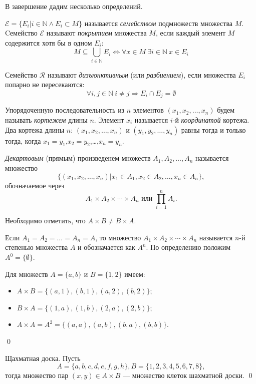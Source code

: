 В завершение дадим несколько определений.

$\mathcal{E}=\{E_i|i\in\mathbb{N}\land E_i\subset M\}$ называется \emph{семейством} подмножеств множества $M$. Cемейство $\mathcal{E}$ называют \emph{покрытием} множества $M$, если каждый элемент $M$ содержится хотя бы в одном $E_i$:
\[
M\subseteq\bigcup_{i\in\mathbb{N}}E_i
\Leftrightarrow
\forall x\in M~\exists i\in\mathbb{N}~x\in E_i
\]

Семейство $\mathcal{R}$ называют \emph{дизъюнктивным} (или \emph{разбиением}), если множества $E_i$ попарно не пересекаются:
\[
\forall i,j\in\mathbb{N}~i\neq j\Rightarrow E_i\cap E_j=\emptyset
\]

Упорядоченную последовательность из $n$ элементов $(x_1,x_2,\ldots,x_n)$ будем называть \emph{кортежем} длины $n$. Элемент $x_i$ называется $i$-й \emph{координатой} кортежа. Два кортежа длины $n$: $(x_1,x_2,\ldots,x_n)$ и $(y_1,y_2,\ldots,y_n)$ равны тогда и только тогда, когда $x_1=y_1$,$x_2=y_2$,\ldots,$x_n=y_n$.

\emph{Декартовым} (прямым) произведенем множеств $A_1,A_2,\ldots,A_n$ называется множество 
\[\{(x_1,x_2,\ldots,x_n)|x_1\in A_1,x_2\in A_2,\ldots,x_n\in A_n\},\]
обозначаемое через 
\[A_1\times A_2\times\cdots\times A_n \text{~или~} \prod_{i=1}^{n}A_i.\]

Необходимо отметить, что $A\times B\neq B\times A$. 

Если $A_1=A_2=\ldots=A_n=A$, то множество $A_1\times A_2\times\cdots\times A_n$ называется $n$-й степенью множества $A$  и обозначается как $A^n$. По определению положим $A^0=\{\emptyset\}$.

\begin{exampl}
    Для множеств $A=\{a,b\}$ и $B=\{1,2\}$ имеем:
    \begin{itemize}
        \item $A\times B=\{(a,1),(b,1),(a,2),(b,2)\}$;
        \item $B\times A=\{(1,a),(1,b),(2,a),(2,b)\}$;
        \item $A\times A=A^2=\{(a,a),(a,b),(b,a),(b,b)\}$.
    \end{itemize}
    \qed
\end{exampl}

\begin{exampl}Щахматная доска.
    Пусть 
    \[
        A=\{a,b,c,d,e,f,g,h\},
        B=\{1,2,3,4,5,6,7,8\},
    \]
            тогда множество пар $(x,y)\in A\times B$ --- множество клеток шахматной доски.
    \qed
\end{exampl}

